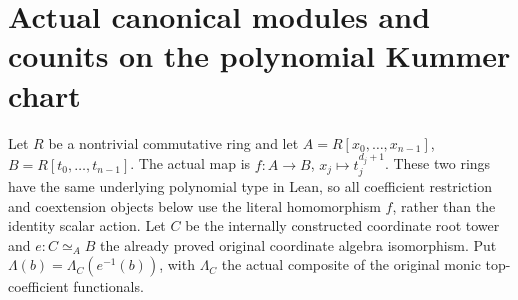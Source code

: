 \section{Actual canonical modules and counits on the polynomial Kummer chart}
\label{sec:kn-nadel-kummer-canonical-trace}

Let $R$ be a nontrivial commutative ring and let
$A=R[x_0,\ldots,x_{n-1}]$, $B=R[t_0,\ldots,t_{n-1}]$.
The actual map is $f:A\to B$, $x_j\mapsto t_j^{d_j+1}$.
These two rings have the same underlying polynomial type in Lean,
so all coefficient restriction and coextension objects below use
the literal homomorphism $f$, rather than the identity scalar action.
Let $C$ be the internally constructed coordinate root tower and
$e:C\simeq_A B$ the already proved original coordinate algebra
isomorphism.  Put
$\Lambda(b)=\Lambda_C(e^{-1}(b))$, with $\Lambda_C$ the actual
composite of the original monic top-coefficient functionals.

